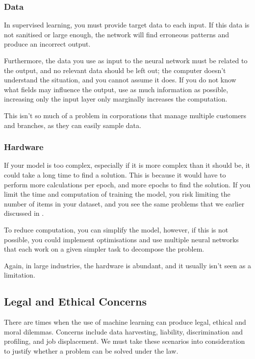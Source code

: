 \subsubsection{Data}
\label{limdata}
In supervised learning, you must provide target data to each input. If this data is not sanitised or large enough, the network will find erroneous patterns and produce an incorrect output.\cite{ngcan}

Furthermore, the data you use as input to the neural network must be related to the output, and no relevant data should be left out; the computer doesn't understand the situation, and you cannot assume it does. If you do not know what fields may influence the output, use as much information as possible, increasing only the input \gls{layer} only marginally increases the computation.

This isn't so much of a problem in corporations that manage multiple customers and branches, as they can easily sample data.


\subsubsection{Hardware}

If your model is too complex, especially if it is more complex than it should be, it could take a long time to find a solution. This is because it would have to perform more calculations per \gls{epoch}, and more epochs to find the solution. If you limit the time and computation of training the model, you risk limiting the number of items in your dataset, and you see the same problems that we earlier discussed in .

To reduce computation, you can simplify the model, however, if this is not possible, you could implement optimisations and use multiple neural networks that each work on a given simpler task to decompose the problem. 

Again, in large industries, the hardware is abundant, and it usually isn't seen as a limitation.

\subsection{Legal and Ethical Concerns}

There are times when the use of machine learning can produce legal, ethical and moral dilemmas. Concerns include data harvesting, liability, discrimination and profiling, and job displacement. We must take these scenarios into consideration to justify whether a problem can be solved under the law.

